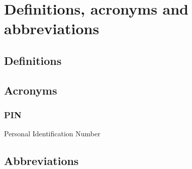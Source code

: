 \section{Definitions, acronyms and abbreviations}

\subsection{Definitions}
\subsection{Acronyms}
	\subsubsection{PIN}
	Personal Identification Number
\subsection{Abbreviations}